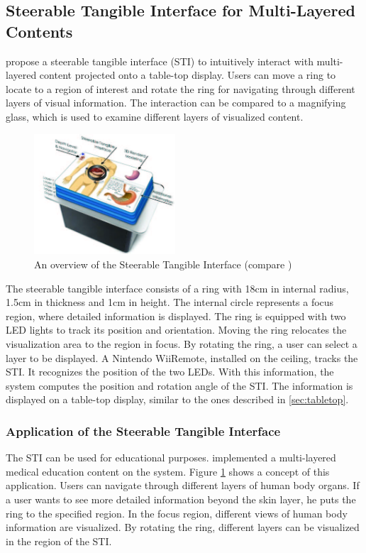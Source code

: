 \subsection{Steerable Tangible Interface for Multi-Layered Contents}
\cite{lee09} propose a steerable tangible interface (STI) to intuitively interact with multi-layered content projected onto a table-top display. Users can move a ring to locate to a region of interest and rotate the ring for navigating through different layers of visual information. The interaction can be compared to a magnifying glass, which is used to examine different layers of visualized content.

\begin{figure}[t]
\centering
\includegraphics[width=0.47\textwidth]{figures/sti.jpg}
\caption{An overview of the Steerable Tangible Interface (compare \protect\cite{lee09})}
\label{fig:sti}
\end{figure}

The steerable tangible interface consists of a ring with 18cm in internal radius, 1.5cm in thickness and 1cm in height. The internal circle represents a focus region, where detailed information is displayed. The ring is equipped with two LED lights to track its position and orientation. Moving the ring relocates the visualization area to the region in focus. By rotating the ring, a user can select a layer to be displayed. A Nintendo WiiRemote, installed on the ceiling,  tracks the STI. It recognizes the position of the two LEDs. With this information, the system computes the position and rotation angle of the STI. The information is displayed on a table-top display, similar to the ones described in \ref{sec:tabletop}.

\subsubsection{Application of the Steerable Tangible Interface}
The STI can be used for educational purposes. \cite{lee09} implemented a multi-layered medical education content on the system. Figure \ref{fig:sti} shows a concept of this application. Users can navigate through different layers of human body organs. If a user wants to see more detailed information beyond the skin layer, he puts the ring to the specified region. In the focus region, different views of human body information are visualized. By rotating the ring, different layers can be visualized in the region of the STI.

